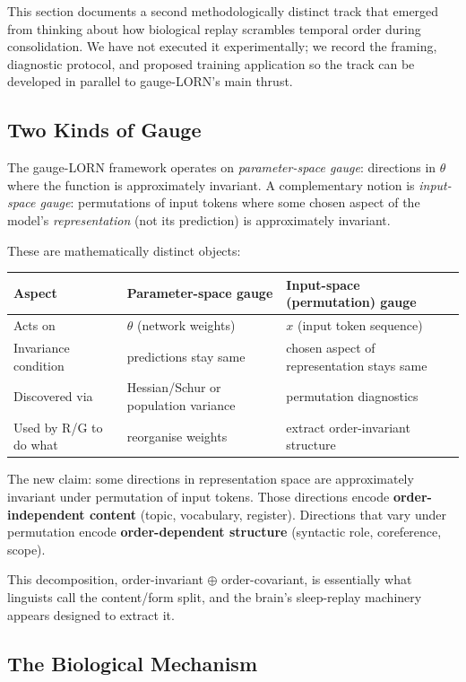 \documentclass[11pt, a4paper]{article}
\theoremstyle{plain}
\theoremstyle{definition}
\theoremstyle{remark}
\begin{document}
This section documents a second methodologically distinct track that emerged from thinking about how biological replay scrambles temporal order during consolidation.
We have not executed it experimentally; we record the framing, diagnostic protocol, and proposed training application so the track can be developed in parallel to gauge-LORN's main thrust.

\subsection{Two Kinds of Gauge}

The gauge-LORN framework operates on \emph{parameter-space gauge}: directions in $\theta$ where the function is approximately invariant.
A complementary notion is \emph{input-space gauge}: permutations of input tokens where some chosen aspect of the model's \emph{representation} (not its prediction) is approximately invariant.

These are mathematically distinct objects:

\begin{center}
\begin{tabular}{p{4.5cm} p{4.5cm} p{4.5cm}}
\toprule
Aspect & Parameter-space gauge & Input-space (permutation) gauge \\
\midrule
Acts on & $\theta$ (network weights) & $x$ (input token sequence) \\
Invariance condition & predictions stay same & chosen aspect of representation stays same \\
Discovered via & Hessian/Schur or population variance & permutation diagnostics \\
Used by R/G to do what & reorganise weights & extract order-invariant structure \\
\bottomrule
\end{tabular}
\end{center}

The new claim: some directions in representation space are approximately invariant under permutation of input tokens.
Those directions encode \textbf{order-independent content} (topic, vocabulary, register).
Directions that vary under permutation encode \textbf{order-dependent structure} (syntactic role, coreference, scope).

This decomposition, order-invariant $\oplus$ order-covariant, is essentially what linguists call the content/form split, and the brain's sleep-replay machinery appears designed to extract it.

\subsection{The Biological Mechanism}
\end{document}
